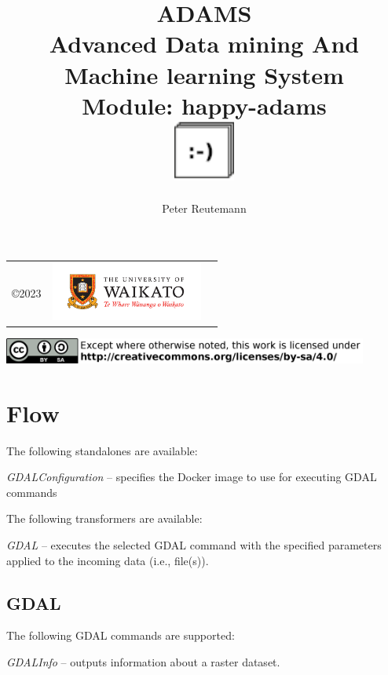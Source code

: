 \documentclass[a4paper]{book}
\title{
  \textbf{ADAMS} \\
  {\Large \textbf{A}dvanced \textbf{D}ata mining \textbf{A}nd \textbf{M}achine
  learning \textbf{S}ystem} \\
  {\Large Module: happy-adams} \\
  \vspace{1cm}
  \includegraphics[width=2cm]{images/happy-adams-module.png} \\
}
\author{
  Peter Reutemann
}
\begin{document}
\begin{titlepage}
\maketitle

\thispagestyle{empty}
\center
\begin{table}[b]
	\begin{tabular}{c l l}
		\parbox[c][2cm]{2cm}{\copyright 2023} &
		\parbox[c][2cm]{5cm}{\includegraphics[width=5cm]{images/coat_of_arms.pdf}} \\
	\end{tabular}
	\includegraphics[width=12cm]{images/cc.png} \\
\end{table}

\end{titlepage}

\tableofcontents

\chapter{Flow}
The following standalones are available:
\begin{tight_itemize}
  \item \textit{GDALConfiguration} -- specifies the Docker image to use for executing GDAL commands
\end{tight_itemize}
The following transformers are available:
\begin{tight_itemize}
  \item \textit{GDAL} -- executes the selected GDAL command with the specified parameters applied to the incoming data (i.e., file(s)).
\end{tight_itemize}


\section{GDAL}
The following GDAL commands are supported:
\begin{tight_itemize}
  \item \textit{GDALInfo} -- outputs information about a raster dataset.
\end{tight_itemize}



\end{document}
